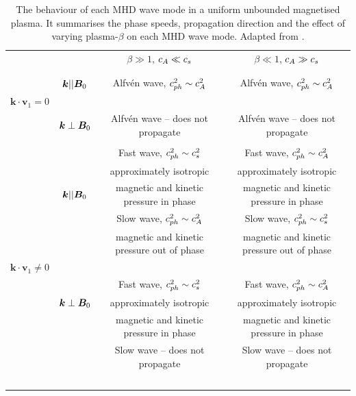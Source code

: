     \begin{table}
	    \centering
		\begin{tabular}{lccc}
   			&			& $\beta \gg 1$, $c_A \ll c_s$	&   $\beta \ll 1$, $c_A \gg c_s$ 	 	\\
   			\vspace{-3mm} \\
   			\hline
   			\hline
   			\vspace{-2mm} \\
   			& $\bm{{k}} || \bm{B}_0$		& Alfv\'{e}n wave, $c_{ph}^2 \sim c_A^2$		& Alfv\'{e}n wave, $c_{ph}^2 \sim c_A^2$	\\
   			$\bm{{k}} \cdot \boldsymbol{{v}}_1 = 0$	&					&									&								\\
   			& $\bm{{k}} \perp \bm{B}_0$	& Alfv\'{e}n wave -- does not propagate 		& Alfv\'{e}n wave -- does not propagate	\\
   			\vspace{2mm} \\
   			& 					& Fast wave, $c_{ph}^2 \sim c_s^2$	 		& Fast wave, $c_{ph}^2 \sim c_A^2$		\\
   			& 					& approximately isotropic	 			& approximately isotropic		\\
   			& $\bm{{k}} || \bm{B}_0$		& magnetic and kinetic pressure in phase	& magnetic and kinetic pressure in phase	\\
   			& 					& Slow wave, $c_{ph}^2 \sim c_A^2$	 		& Slow wave, $c_{ph}^2 \sim c_s^2$		\\
   			& 					& magnetic and kinetic pressure out of phase	& magnetic and kinetic pressure out of phase	\\
   			$\bm{{k}} \cdot \boldsymbol{{v}}_1 \neq 0$&					&									&							\\
   			& 					& Fast wave, $c_{ph}^2 \sim c_s^2$	 		& Fast wave, $c_{ph}^2 \sim c_A^2$		\\
   			& $\bm{{k}} \perp \bm{B}_0$	& approximately isotropic	 			& approximately isotropic		\\
   			& 					& magnetic and kinetic pressure in phase	& magnetic and kinetic pressure in phase	\\
   			& 					& Slow wave -- does not propagate	 		& Slow wave -- does not propagate		\\
   			\hline
   			~&~&~ \\
   		\end{tabular}
		\caption{
				 The behaviour of each MHD wave mode in a uniform unbounded magnetised plasma.
				 It summarises the phase speeds, propagation direction and the effect of varying plasma-$\beta$ on each MHD wave mode.
			     Adapted from \cite{jess2015multiwavelength}.
			    }
		\label{tab:uniform_medium}
     \end{table}
     
